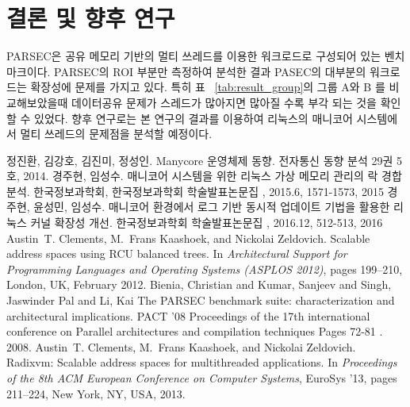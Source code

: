 \documentclass{kcc}
\begin{document}
\section{결론 및 향후 연구}
PARSEC은 공유 메모리 기반의 멀티 쓰레드를 이용한 워크로드로 구성되어 있는 벤치마크이다.
PARSEC의 ROI 부분만 측정하여 분석한 결과 PASEC의 대부분의 워크로드는 확장성에 문제를 
가지고 있다. 특히 표 ~\ref{tab:result_group}의 그룹 A와 B 를 비교해보았을때 데이터공유 문제가 스레드가 많아지면 많아질 수록 부각 되는 것을 확인할 수 있었다.  
향후 연구로는 본 연구의 결과를 이용하여 리눅스의 매니코어 시스템에서 멀티 쓰레드의 
문제점을 분석할 예정이다.


\begin{thebibliography}{7}
정진환, 김강호, 김진미, 정성인. 
\newblock Manycore 운영체제 동향. 
\newblock 전자통신 동향 분석 29권 5호, 2014. 
경주현, 임성수.
\newblock 매니코어 시스템을 위한 리눅스 가상 메모리 관리의 락 경합 분석. 
\newblock 한국정보과학회, 한국정보과학회 학술발표논문집 , 2015.6, 1571-1573, 2015
경주현, 윤성민, 임성수.
\newblock 매니코어 환경에서 로그 기반 동시적 업데이트 기법을 활용한 리눅스 커널 확장성 개선.
\newblock 한국정보과학회 학술발표논문집 , 2016.12, 512-513, 2016
Austin~T. Clements, M.~Frans Kaashoek, and Nickolai Zeldovich.
\newblock Scalable address spaces using {RCU} balanced trees.
\newblock In {\em Architectural Support for Programming Languages and Operating
  Systems (ASPLOS 2012)}, pages 199--210, London, UK, February 2012.
Bienia, Christian and Kumar, Sanjeev and Singh, Jaswinder Pal and Li, Kai
\newblock The PARSEC benchmark suite: characterization and architectural
implications.
\newblock PACT '08 Proceedings of the 17th international
conference on Parallel architectures and compilation techniques Pages 72-81 . 2008.
Austin~T. Clements, M.~Frans Kaashoek, and Nickolai Zeldovich.
\newblock Radixvm: Scalable address spaces for multithreaded applications.
\newblock In {\em Proceedings of the 8th ACM European Conference on Computer
  Systems}, EuroSys '13, pages 211--224, New York, NY, USA, 2013.

\end{thebibliography}

%
%
\end{document}

